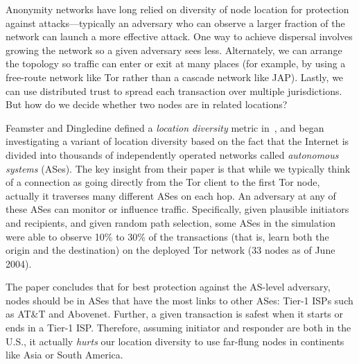\documentclass{llncs}
\begin{document}
Anonymity networks have long relied on diversity of node location for
protection against attacks---typically an adversary who can observe a
larger fraction of the network can launch a more effective attack. One
way to achieve dispersal involves growing the network so a given adversary
sees less. Alternately, we can arrange the topology so traffic can enter
or exit at many places (for example, by using a free-route network
like Tor rather than a cascade network like JAP). Lastly, we can use
distributed trust to spread each transaction over multiple jurisdictions.
But how do we decide whether two nodes are in related locations?

Feamster and Dingledine defined a \emph{location diversity} metric
in~\cite{feamster:wpes2004}, and began investigating a variant of location
diversity based on the fact that the Internet is divided into thousands of
independently operated networks called {\em autonomous systems} (ASes).
The key insight from their paper is that while we typically think of a
connection as going directly from the Tor client to the first Tor node,
actually it traverses many different ASes on each hop. An adversary at
any of these ASes can monitor or influence traffic. Specifically, given
plausible initiators and recipients, and given random path selection,
some ASes in the simulation were able to observe 10\% to 30\% of the
transactions (that is, learn both the origin and the destination) on
the deployed Tor network (33 nodes as of June 2004).

The paper concludes that for best protection against the AS-level
adversary, nodes should be in ASes that have the most links to other ASes:
Tier-1 ISPs such as AT\&T and Abovenet. Further, a given transaction
is safest when it starts or ends in a Tier-1 ISP\@. Therefore, assuming
initiator and responder are both in the U.S., it actually \emph{hurts}
our location diversity to use far-flung nodes in
continents like Asia or South America.
\end{document}
